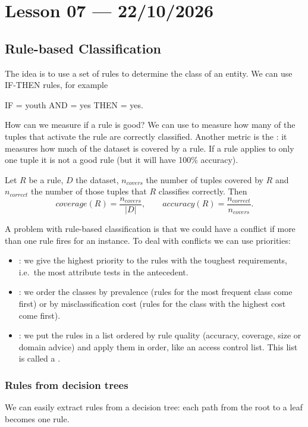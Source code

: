 \section{Lesson 07 --- 22/10/2026}

\subsection{Rule-based Classification}
The idea is to use a set of rules to determine the class of an entity. We can use IF-THEN rules, for example
\begin{center}
  IF  = youth AND  = yes THEN  = yes.
\end{center}
How can we measure if a rule is good? We can use  to measure how many of the tuples that activate the rule are correctly classified. Another metric is the : it measures how much of the dataset is covered by a rule. If a rule applies to only one tuple it is not a good rule (but it will have 100\% accuracy).

\begin{definition}
Let $R$ be a rule, $D$ the dataset, $n_{covers}$ the number of tuples covered by $R$ and $n_{correct}$ the number of those tuples that $R$ classifies correctly. Then
\[
  coverage(R) = \frac{n_{covers}}{|D|}, \qquad accuracy(R) = \frac{n_{correct}}{n_{covers}}.
\]
\end{definition}

A problem with rule-based classification is that we could have a conflict if more than one rule fires for an instance. To deal with conflicts we can use priorities:
\begin{itemize}
  \item {}: we give the highest priority to the rules with the toughest requirements, i.e.\ the most attribute tests in the antecedent.
  \item {}: we order the classes by prevalence (rules for the most frequent class come first) or by misclassification cost (rules for the class with the highest cost come first).
  \item {}: we put the rules in a list ordered by rule quality (accuracy, coverage, size or domain advice) and apply them in order, like an access control list. This list is called a .
\end{itemize}

\subsubsection{Rules from decision trees}
We can easily extract rules from a decision tree: each path from the root to a leaf becomes one rule.

